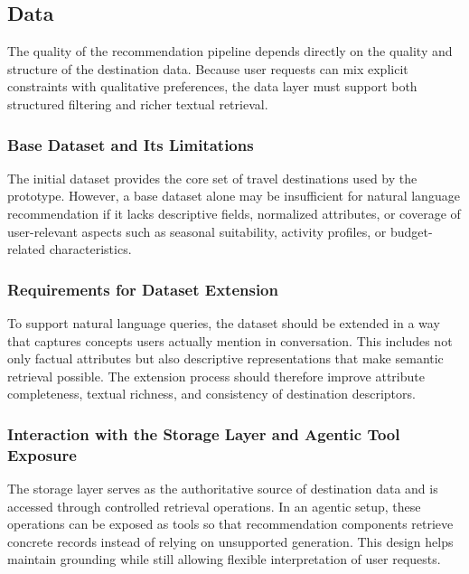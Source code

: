 
\subsection{Data}\label{subsection:system-architecture:data}
The quality of the recommendation pipeline depends directly on the quality and structure of the destination data. Because user requests can mix explicit constraints with qualitative preferences, the data layer must support both structured filtering and richer textual retrieval.

\subsubsection{Base Dataset and Its Limitations}\label{subsubsection:system-architecture:base-dataset}
The initial dataset provides the core set of travel destinations used by the prototype. However, a base dataset alone may be insufficient for natural language recommendation if it lacks descriptive fields, normalized attributes, or coverage of user-relevant aspects such as seasonal suitability, activity profiles, or budget-related characteristics.


\subsubsection{Requirements for Dataset Extension}\label{subsubsection:system-architecture:dataset-extension}
To support natural language queries, the dataset should be extended in a way that captures concepts users actually mention in conversation. This includes not only factual attributes but also descriptive representations that make semantic retrieval possible. The extension process should therefore improve attribute completeness, textual richness, and consistency of destination descriptors.

\subsubsection{Interaction with the Storage Layer and Agentic Tool Exposure}\label{subsubsection:system-architecture:storage-tooling}
The storage layer serves as the authoritative source of destination data and is accessed through controlled retrieval operations. In an agentic setup, these operations can be exposed as tools so that recommendation components retrieve concrete records instead of relying on unsupported generation. This design helps maintain grounding while still allowing flexible interpretation of user requests.

